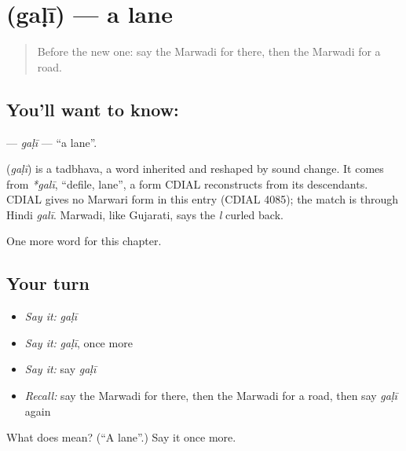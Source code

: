 \section[\texorpdfstring{\mw{गळी} (gaḷī)}{गळी (gaḷī)}]{ (gaḷī) — a lane}

\label{lesson:MW-C82-gali}



\begin{quote}
Before the new one: say the Marwadi for there, then the Marwadi for a road.
\end{quote}

\subsection*{You'll want to know: }
\textbf{} — \emph{gaḷī} — \textquotedblleft{}a lane\textquotedblright{}.

\begin{cousinweb}
\textbf{} (\emph{gaḷī}) is a tadbhava, a word inherited and reshaped by sound change. It comes from \emph{*galī}, \textquotedblleft{}defile, lane\textquotedblright{}, a form CDIAL reconstructs from its descendants. CDIAL gives no Marwari form in this entry (CDIAL 4085); the match is through Hindi \emph{galī}. Marwadi, like Gujarati, says the \emph{l} curled back.
\end{cousinweb}

\begin{grammarlens}[title={What you've built}]
One more word for this chapter.
\end{grammarlens}

\subsection*{Your turn}
\begin{itemize}
\raggedright
  \item \emph{Say it:} \emph{gaḷī}
  \item \emph{Say it:} \emph{gaḷī}, once more
  \item \emph{Say it:} say \emph{gaḷī}
  \item \emph{Recall:} say the Marwadi for there, then the Marwadi for a road, then say \emph{gaḷī} again
\end{itemize}

\begin{tcolorbox}[breakable,colback=teal!4,colframe=teal!35!black,title={Before you move on}]
What does  mean? (\textquotedblleft{}A lane\textquotedblright{}.) Say it once more.
\end{tcolorbox}
